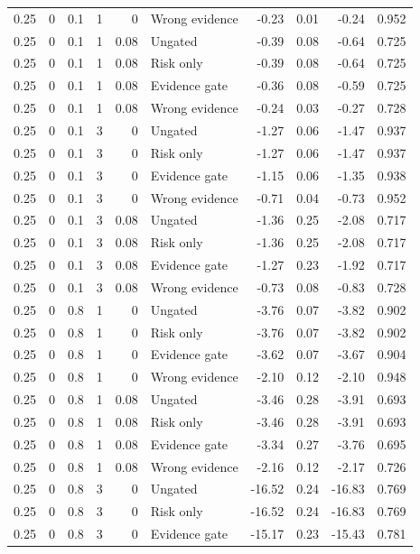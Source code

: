 \begin{longtable}{rrrrrlrrrr}
0.25 & 0 & 0.1 & 1 & 0 & Wrong evidence & -0.23 & 0.01 & -0.24 & 0.952\\
0.25 & 0 & 0.1 & 1 & 0.08 & Ungated & -0.39 & 0.08 & -0.64 & 0.725\\
0.25 & 0 & 0.1 & 1 & 0.08 & Risk only & -0.39 & 0.08 & -0.64 & 0.725\\
0.25 & 0 & 0.1 & 1 & 0.08 & Evidence gate & -0.36 & 0.08 & -0.59 & 0.725\\
0.25 & 0 & 0.1 & 1 & 0.08 & Wrong evidence & -0.24 & 0.03 & -0.27 & 0.728\\
0.25 & 0 & 0.1 & 3 & 0 & Ungated & -1.27 & 0.06 & -1.47 & 0.937\\
0.25 & 0 & 0.1 & 3 & 0 & Risk only & -1.27 & 0.06 & -1.47 & 0.937\\
0.25 & 0 & 0.1 & 3 & 0 & Evidence gate & -1.15 & 0.06 & -1.35 & 0.938\\
0.25 & 0 & 0.1 & 3 & 0 & Wrong evidence & -0.71 & 0.04 & -0.73 & 0.952\\
0.25 & 0 & 0.1 & 3 & 0.08 & Ungated & -1.36 & 0.25 & -2.08 & 0.717\\
0.25 & 0 & 0.1 & 3 & 0.08 & Risk only & -1.36 & 0.25 & -2.08 & 0.717\\
0.25 & 0 & 0.1 & 3 & 0.08 & Evidence gate & -1.27 & 0.23 & -1.92 & 0.717\\
0.25 & 0 & 0.1 & 3 & 0.08 & Wrong evidence & -0.73 & 0.08 & -0.83 & 0.728\\
0.25 & 0 & 0.8 & 1 & 0 & Ungated & -3.76 & 0.07 & -3.82 & 0.902\\
0.25 & 0 & 0.8 & 1 & 0 & Risk only & -3.76 & 0.07 & -3.82 & 0.902\\
0.25 & 0 & 0.8 & 1 & 0 & Evidence gate & -3.62 & 0.07 & -3.67 & 0.904\\
0.25 & 0 & 0.8 & 1 & 0 & Wrong evidence & -2.10 & 0.12 & -2.10 & 0.948\\
0.25 & 0 & 0.8 & 1 & 0.08 & Ungated & -3.46 & 0.28 & -3.91 & 0.693\\
0.25 & 0 & 0.8 & 1 & 0.08 & Risk only & -3.46 & 0.28 & -3.91 & 0.693\\
0.25 & 0 & 0.8 & 1 & 0.08 & Evidence gate & -3.34 & 0.27 & -3.76 & 0.695\\
0.25 & 0 & 0.8 & 1 & 0.08 & Wrong evidence & -2.16 & 0.12 & -2.17 & 0.726\\
0.25 & 0 & 0.8 & 3 & 0 & Ungated & -16.52 & 0.24 & -16.83 & 0.769\\
0.25 & 0 & 0.8 & 3 & 0 & Risk only & -16.52 & 0.24 & -16.83 & 0.769\\
0.25 & 0 & 0.8 & 3 & 0 & Evidence gate & -15.17 & 0.23 & -15.43 & 0.781\\

\end{longtable}
